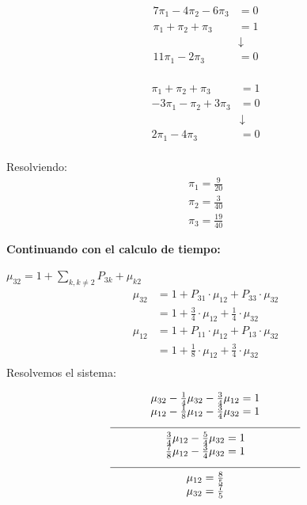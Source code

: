\documentclass{templateNote}
\begin{document}
\begin{minipage}{0.45\textwidth}
    \begin{align*}
        7\pi_1 - 4\pi_2 - 6\pi_3 &= 0\\
        \pi_1 + \pi_2 + \pi_3 &= 1\\
        \phantom{\pi_1 + \pi_2 + \pi_3} &\downarrow\\
        11\pi_1 - 2\pi_3 &= 0\\
    \end{align*}
\end{minipage}
\hfill
\begin{minipage}{0.45\textwidth}
    \begin{align*}
        \pi_1 + \pi_2 + \pi_3 &= 1\\
        -3\pi_1 - \pi_2 + 3\pi_3 &= 0\\
        \phantom{\pi_1 + \pi_2 + \pi_3} &\downarrow\\
        2\pi_1 - 4\pi_3 &= 0\\
    \end{align*}
\end{minipage}
Resolviendo:
\begin{align*}
    \pi_1 = \frac{9}{20}\\
    \pi_2 = \frac{3}{40}\\
    \pi_3 = \frac{19}{40}
\end{align*}

\textbf{Continuando con el calculo de tiempo:}

$\mu_{32} = 1+ \sum_{k,k\neq2}^{} P_{3k} + \mu_{k2}$
\begin{align*}
    \mu_{32} &= 1+ P_{31} \cdot \mu_{12} + P_{33} \cdot \mu_{32}\\
            &= 1+ \frac{3}{4} \cdot \mu_{12} + \frac{1}{4} \cdot \mu_{32}\\
    \mu_{12} &= 1+ P_{11} \cdot \mu_{12} + P_{13} \cdot \mu_{32}\\
            &= 1+ \frac{1}{8} \cdot \mu_{12} + \frac{3}{4} \cdot \mu_{32}\\
\end{align*}
Resolvemos el sistema:
\begin{center}
    \begin{align*}
        \begin{array}{c}
            \mu_{32} - \frac{1}{4} \mu_{32} - \frac{3}{4} \mu_{12} = 1 \\
            \mu_{12} - \frac{1}{8} \mu_{12} - \frac{3}{4} \mu_{32} = 1 \\
            \rule{0.5\linewidth}{0.4pt} \\
            \frac{3}{4} \mu_{12} - \frac{5}{4} \mu_{32} = 1 \\
            \frac{7}{8} \mu_{12} - \frac{3}{4} \mu_{32} = 1 \\
            \rule{0.5\linewidth}{0.4pt} \\
            \mu_{12} = \frac{8}{5} \\
            \mu_{32} = \frac{7}{5} \\
        \end{array}
    \end{align*}
\end{center}
\end{document}
